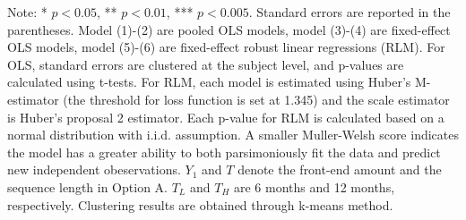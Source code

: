\documentclass[12pt]{article}
\begin{document}
\begin{table}
    \vspace*{4pt}
    \centering
    \begin{minipage}{1.0\textwidth}
    {\par\footnotesize Note: * $p<0.05$, ** $p<0.01$, *** $p<0.005$. Standard errors are reported in the parentheses. Model (1)-(2) are pooled OLS models, model (3)-(4) are fixed-effect OLS models, model (5)-(6) are fixed-effect robust linear regressions (RLM). For OLS, standard errors are clustered at the subject level, and p-values are calculated using t-tests. For RLM, each model is estimated using Huber's M-estimator (the threshold for loss function is set at 1.345) and the scale estimator is Huber's proposal 2 estimator. Each p-value for RLM is calculated based on a normal distribution with i.i.d. assumption. A smaller Muller-Welsh score indicates the model has a greater ability to both parsimoniously fit the data and predict new independent obeservations. $Y_1$ and $T$ denote the front-end amount and the sequence length in Option A. $T_L$ and $T_H$ are 6 months and 12 months, respectively. Clustering results are obtained through k-means method.}
    \end{minipage}
    \label{tab:seq_value_reg}
\end{table}
\end{document}
